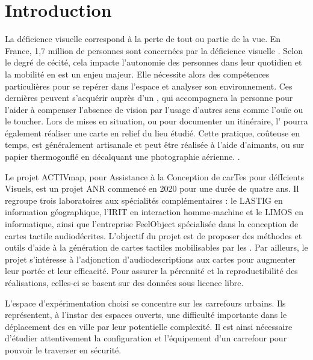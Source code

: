 \chapter*{Introduction}



La déficience visuelle correspond à la perte de tout ou partie de la vue. En France, 1,7 million de personnes sont concernées par la déficience visuelle . Selon le degré de cécité, cela impacte l’autonomie des personnes dans leur quotidien et la mobilité en est un enjeu majeur. Elle nécessite alors des compétences particulières pour se repérer dans l'espace et analyser son environnement. Ces dernières peuvent s'acquérir auprès d'un \ipa{}, qui accompagnera la personne pour l'aider à compenser l'absence de vision par l'usage d'autres sens comme l'ouïe ou le toucher. Lors de mises en situation, ou pour documenter un itinéraire, l'\ipa{} pourra également réaliser une carte en relief du lieu étudié. Cette pratique, coûteuse en temps, est généralement artisanale et peut être réalisée à l'aide d'aimants, ou sur papier thermogonflé en décalquant une photographie aérienne. .


\newpar{}

Le projet ACTIVmap, pour Assistance à la Conception de carTes pour défIcients Visuels, est un projet ANR commencé en 2020 pour une durée de quatre ans. Il regroupe trois laboratoires aux spécialités complémentaires : le LASTIG en information géographique, l'IRIT en interaction homme-machine et le LIMOS en informatique, ainsi que l'entreprise FeelObject spécialisée dans la conception de cartes tactile audiodécrites. L'objectif du projet est de proposer des méthodes et outils d'aide à la génération de cartes tactiles mobilisables par les \ipas{}. Par ailleurs, le projet s'intéresse à l'adjonction d'audiodescriptions aux cartes pour augmenter leur portée et leur efficacité. Pour assurer la pérennité et la reproductibilité des réalisations, celles-ci se basent sur des données sous licence libre.

L'espace d'expérimentation choisi se concentre sur les carrefours urbains. Ils représentent, à l'instar des espaces ouverts, une difficulté importante dans le déplacement des \pcdvs{} en ville par leur potentielle complexité. Il est ainsi nécessaire d'étudier attentivement la configuration et l'équipement d'un carrefour pour pouvoir le traverser en sécurité.

